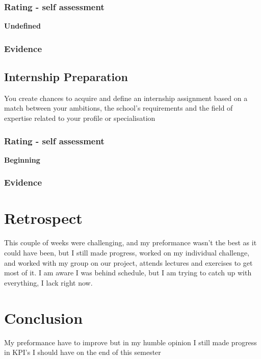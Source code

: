 \documentclass[a4paper, 11pt]{article}
\begin{document}
\subsubsection{Rating - self assessment}
\textbf{Undefined} 
\subsubsection{Evidence}

\subsection{Internship Preparation}
You create chances to acquire and define an internship assignment based on a match between your ambitions, the school's requirements and the field of expertise related to your profile or specialisation

\subsubsection{Rating - self assessment}
\textbf{Beginning} 
\subsubsection{Evidence}


\section{Retrospect}
This couple of weeks were challenging, and my preformance wasn't the best as it could have been, but I still made progress, worked on my individual challenge, and worked with my group on our project, attends lectures and exercises to get most of it. I am aware I was behind schedule, but I am trying to catch up with everything, I lack right now.
\section{Conclusion}
My preformance have to improve but in my humble opinion I still made progress in KPI's I should have on the end of this semester 
\end{document}
